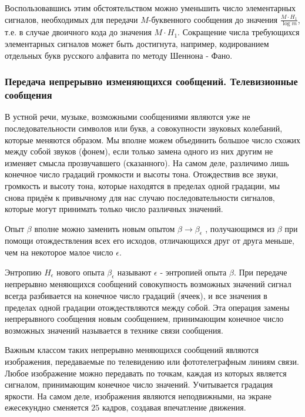 ﻿\documentclass[a4paper,12pt]{report}
\begin{document}
	Воспользовавшись этим обстоятельством можно уменьшить число элементарных сигналов, необходимых для передачи $M$-буквенного сообщения до значения $\frac{M \cdot H_1}{\log m}$, т.е. в случае двоичного кода до значения $M \cdot H_1$. Сокращение числа требующихся элементарных сигналов может быть достигнута, например, кодированием отдельных букв русского алфавита по методу Шеннона - Фано.
	


	\subsubsection{Передача непрерывно изменяющихся сообщений. Телевизионные сообщения}
	
	В устной речи, музыке, возможными сообщениями являются уже не последовательности символов или букв, а совокупности звуковых колебаний, которые меняются  образом. Мы вполне можем объединить большое число схожих между собой звуков (фонем), если только замена одного из них другим не изменяет смысла прозвучавшего (сказанного). На самом деле, различимо лишь конечное число градаций громкости и высоты тона. Отождествив все звуки, громкость и высоту тона, которые находятся в пределах одной градации, мы снова придём к привычному для нас случаю последовательности сигналов, которые могут принимать только  число различных значений.
	
	Опыт $\beta$ вполне можно заменить новым опытом $\beta \rightarrow \beta_\epsilon$ , получающимся из $\beta$ при помощи отождествления всех его исходов, отличающихся друг от друга меньше, чем на некоторое малое число $\epsilon$.
	
	Энтропию $H_\epsilon$ нового опыта $\beta_\epsilon$ называют $\epsilon$ - энтропией опыта $\beta$. При передаче непрерывно меняющихся сообщений совокупность возможных значений сигнал всегда разбивается на конечное число градаций (ячеек), и все значения в пределах одной градации отождествляются между собой. Эта операция замены непрерывного сообщения новым сообщением, принимающим конечное число возможных значений называется в технике связи  сообщения.
	
	Важным классом таких непрерывно меняющихся сообщений являются изображения, передаваемые по телевидению или фототелеграфным линиям связи. Любое изображение можно передавать по точкам, каждая из которых является сигналом, принимающим конечное число значений. Учитывается градация яркости. На самом деле, изображения являются неподвижными, на экране ежесекундно сменяется $25$ кадров, создавая впечатление движения.
	
\end{document}
